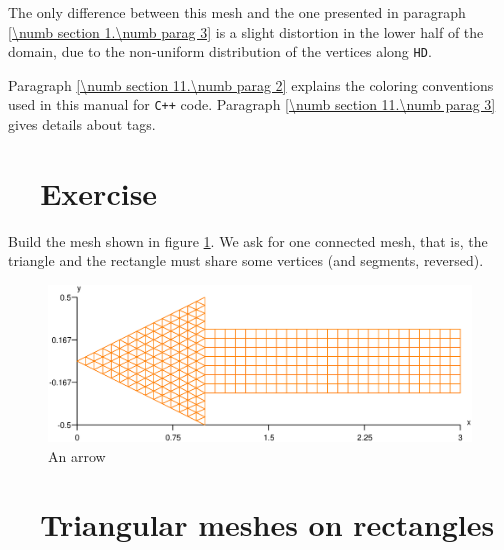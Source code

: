 The only difference between this mesh and the one presented in paragraph
\ref{\numb section 1.\numb parag 3} is a slight distortion in the lower half of the domain,
due to the non-uniform distribution of the vertices along {\small\tt HD}.

Paragraph \ref{\numb section 11.\numb parag 2} explains the coloring conventions used in
this manual for {\tt C++} code.
Paragraph \ref{\numb section 11.\numb parag 3} gives details about \textcolor{tag}{tag}s.


\section{~~Exercise}\label{\numb section 2.\numb parag 2}

Build the mesh shown in figure \ref{\numb section 2.\numb fig 2}.
We ask for one connected mesh, that is, the triangle and the rectangle must share some vertices
(and segments, reversed).

\begin{figure}[ht] \centering
  \includegraphics[width=130mm]{arrow}
  \caption{An arrow}
  \label{\numb section 2.\numb fig 2}
\end{figure}


\section{~~Triangular meshes on rectangles}\label{\numb section 2.\numb parag 3}

